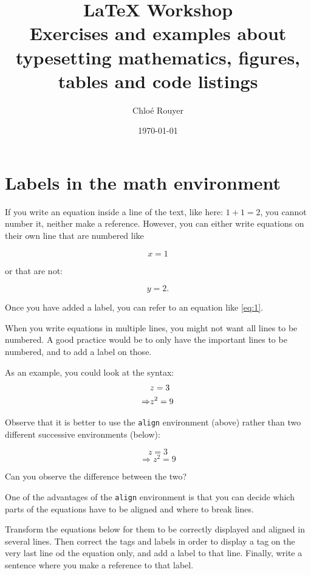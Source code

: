 \documentclass{article}
\author{Chloé Rouyer}
\title{\LARGE{\LaTeX{} Workshop}\\
	\large{Exercises and examples about typesetting mathematics, figures, tables and code listings}
}
\date{\today}
\begin{document}
	\maketitle
	
	\tableofcontents
	
	\newpage
	
	\section{Labels in the math environment}
	
	If you write an equation inside a line of the text, like here: \( 1 + 1 = 2\), you cannot number it, neither make a reference. However, you can either write equations on their own line that are numbered like
	
	\begin{equation} x = 1 \label{eq:1}\end{equation}
	
	or that are not:
	
	\[ y = 2. \]
	
	
	Once you have added a label, you can refer to an equation like \eqref{eq:1}.
	
	When you write equations in multiple lines, you might not want all lines to be numbered. A good practice would be to only have the important lines to be numbered, and to add a label on those.
	
	As an example, you could look at the syntax: 
	\begin{align}
		 & z = 3  \notag \\
		 \Rightarrow & z^2 = 9 \label{eq:z2}
	\end{align}
	
	Observe that it is better to use the \texttt{align} environment  (above) rather than two different successive environments (below):
	
	\[z = 3\]
	\begin{equation}
		\Rightarrow z^2 = 9
	\end{equation}
	
	Can you observe the difference between the two?
	
	
	One of the advantages of the \texttt{align} environment is that you can decide which parts of the equations have to be aligned and where to break lines. 
	
	Transform the equations below for them to be correctly displayed and aligned in several lines. Then correct the tags and labels in order to display a tag on the very last line od the equation only, and add a label to that line. Finally, write a sentence where you make a reference to that label.
	
\end{document}
